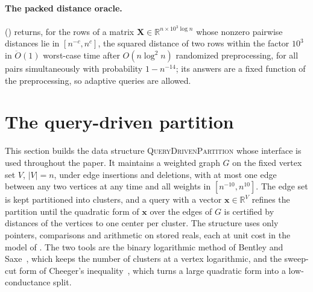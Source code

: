 \documentclass[11pt]{article}
\theoremstyle{remark}
\newcommand{\xx}{\mathbf x}
\newcommand{\XX}{\mathbf X}
\newcommand{\R}{\mathbb R}
\newcommand{\Odouble}{\ddot{O}}
\begin{document}
\paragraph{The packed distance oracle.}
 () returns, for the rows of a matrix
$\XX\in\R^{n\times10^{3}\log n}$ whose nonzero pairwise distances lie in
$[n^{-c},n^{c}]$, the squared distance of two rows within the factor $10^{3}$
in $\Odouble(1)$ worst-case time after $O(n\log^{2}n)$ randomized
preprocessing, for all pairs simultaneously with probability $1-n^{-14}$; its
answers are a fixed function of the preprocessing, so adaptive queries are
allowed.

\section{The query-driven partition}
\label{sec:partition}

This section builds the data structure \textsc{QueryDrivenPartition} whose
interface is used throughout the paper.
It maintains a weighted graph $G$ on the fixed vertex set $V$, $|V| = n$,
under edge insertions and deletions, with at most one edge between any two
vertices at any time and all weights in $[n^{-10}, n^{10}]$.
The edge set is kept partitioned into clusters, and a query with a vector
$\xx \in \R^{V}$ refines the partition until the quadratic form of $\xx$
over the edges of $G$ is certified by distances of the vertices to one
center per cluster.
The structure uses only pointers, comparisons and arithmetic on stored
reals, each at unit cost in the model of .
The two tools are the binary logarithmic method of Bentley and
Saxe~\cite{BS80:journal}, which keeps the number of clusters at a vertex
logarithmic, and the sweep-cut form of Cheeger's
inequality~\cite{C97:book}, which turns a large quadratic form into a
low-conductance split.
\end{document}
